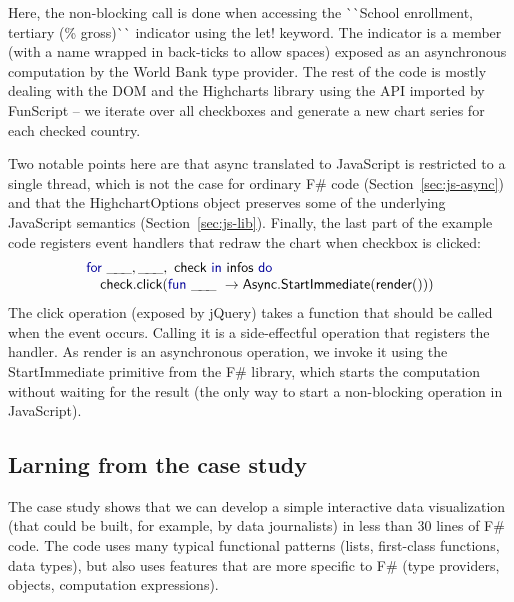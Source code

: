 \documentclass[submission,copyright,creativecommons]{eptcs}
\newcommand{\ignp}{\_\kern-.5ex\_\kern-.5ex\_ }
\newcommand{\kvd}[1]{\textnormal{\textcolor{kvdclr}{\sffamily #1}}}
\newcommand{\ident}[1]{\textnormal{\sffamily #1}}
\newcommand{\lident}[1]{\textnormal{\sffamily 
  \`{}\hspace{-0.25em}\`{}\hspace{-0.1em}#1\`{}\hspace{-0.25em}\`{}}}
\begin{document}
Here, the non-blocking call is done when accessing the \lident{School enrollment, tertiary (\% gross)} 
indicator using the \kvd{let!} keyword. The indicator is a member (with a name wrapped in 
back-ticks to allow spaces) exposed as an asynchronous computation by the World Bank type provider.
The rest of the code is mostly dealing with the DOM and the Highcharts library using the API 
imported by FunScript -- we iterate over all checkboxes and generate a new chart series for each 
checked country. 

Two notable points here are that \ident{async} translated to JavaScript is restricted to a single 
thread, which is not the case for ordinary F\# code (Section~\ref{sec:js-async}) and that the 
\ident{HighchartOptions} object preserves some of the underlying JavaScript semantics 
(Section~\ref{sec:js-lib}). Finally, the last part of the example code registers event handlers that 
redraw the chart when checkbox is clicked:
%
\begin{equation*}
\begin{array}{lll}
 \kvd{for}~\ignp, \ignp,~\ident{check}~\kvd{in}~\ident{infos}~\kvd{do} \\
 \quad \ident{check.click}(\kvd{fun}~\ignp~\rightarrow \ident{Async.StartImmediate}(\ident{render}()))
\end{array}
\end{equation*}
%
The \ident{click} operation (exposed by jQuery) takes a function that should be called when the 
event occurs. Calling it is a side-effectful operation that registers the handler. As \ident{render} 
is an asynchronous operation, we invoke it using the \ident{StartImmediate} primitive from the 
F\# library, which starts the computation without waiting for the result (the only way to start
a non-blocking operation in JavaScript).


\subsection{Larning from the case study}

The case study shows that we can develop a simple interactive data visualization (that could
be built, for example, by data journalists) in less than 30 lines of F\# code. The code uses 
many typical functional patterns (lists, first-class functions, data types), but also uses features
that are more specific to F\# (type providers, objects, computation expressions). 
\end{document}
